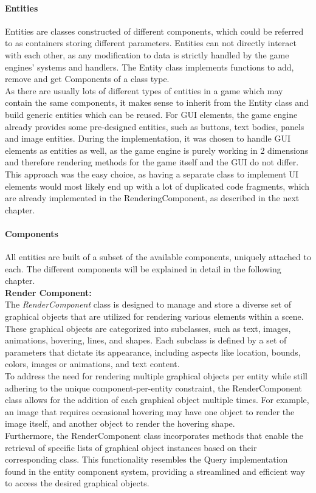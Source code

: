 \paragraph{Entities}
Entities are classes constructed of different components, which could be referred to as containers storing different parameters.
Entities can not directly interact with each other, as any modification to data is strictly handled by the game engines' systems and handlers.
The Entity class implements functions to add, remove and get Components of a class type.
\\
As there are usually lots of different types of entities in a game which may contain the same components, it makes sense to inherit from the Entity class and
build generic entities which can be reused.
For GUI elements, the game engine already provides some pre-designed entities, such as buttons, text bodies, panels and image entities.
During the implementation, it was chosen to handle GUI elements as entities as well, as the game engine is purely working in 2 dimensions and therefore
rendering methods for the game itself and the GUI do not differ.
This approach was the easy choice, as having a separate class to implement UI elements would most likely end up with a lot of duplicated
code fragments, which are already implemented in the RenderingComponent, as described in the next chapter.

\paragraph{Components}\label{par:components}
All entities are built of a subset of the available components, uniquely attached to each.
The different components will be explained in detail in the following chapter.
\\
\textbf{Render Component:} \\
The \textit{RenderComponent} class is designed to manage and store a diverse set of graphical objects that are utilized for rendering various elements within a scene.
These graphical objects are categorized into subclasses, such as text, images, animations, hovering, lines, and shapes.
Each subclass is defined by a set of parameters that dictate its appearance, including aspects like location, bounds, colors, images or animations, and text content.
\\
To address the need for rendering multiple graphical objects per entity while still adhering to the unique component-per-entity constraint, the RenderComponent class allows for the addition of each graphical object multiple times.
For example, an image that requires occasional hovering may have one object to render the image itself, and another object to render the hovering shape.
\\
Furthermore, the RenderComponent class incorporates methods that enable the retrieval of specific lists of graphical object instances based on their corresponding class.
This functionality resembles the Query implementation found in the entity component system, providing a streamlined and efficient way to access the desired graphical objects.

